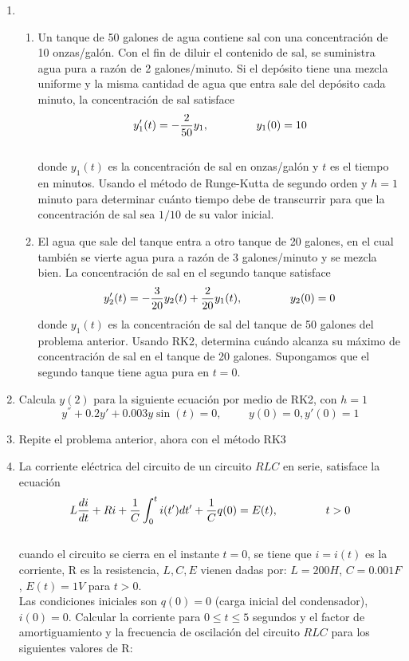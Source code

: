 \documentclass[12pt]{article}
\begin{document}
\begin{enumerate}
\item \begin{enumerate}
\item Un tanque de 50 galones de agua contiene sal con una concentración de 10 onzas/galón. Con el fin de diluir el contenido de sal, se suministra agua pura a razón de 2 galones/minuto. Si el depósito tiene una mezcla uniforme y la misma cantidad de agua que entra sale del depósito cada minuto, la concentración de sal satisface\\
\[ y'_{1}(t)= -\frac{2}{50}y_{1}, \hspace{1.5cm} y_{1}(0)=10 \]\\
donde $y_{1}(t)$ es la concentración de sal en onzas/galón y $t$ es el tiempo en minutos. Usando el método de Runge-Kutta de segundo orden y $h=1$ minuto para determinar cuánto tiempo debe de transcurrir para que la concentración de sal sea $1/10$ de su valor inicial.
\item El agua que sale del tanque entra a otro tanque de 20 galones, en el cual también se vierte agua pura a razón de 3 galones/minuto y se mezcla bien. La concentración de sal en el segundo tanque satisface
\[ y'_{2}(t)= -\frac{3}{20}y_{2}(t)+\dfrac{2}{20}y_{1}(t), \hspace{1.5cm} y_{2}(0)=0 \]
donde $y_{1}(t)$ es la concentración de sal del tanque de 50 galones del problema anterior. Usando RK2, determina cuándo alcanza su máximo de concentración de sal en el tanque de 20 galones. Supongamos que el segundo tanque tiene agua pura en $t=0$.
\end{enumerate}
\item Calcula $y(2)$ para la siguiente ecuación por medio de RK2, con $h=1$
\[ y^{''} +0.2 y{'} + 0.003 y \sin(t) = 0, \hspace{1cm} y(0)=0, y{'}(0)=1 \]
\item Repite el problema anterior, ahora con el método RK3
\item La corriente eléctrica del circuito de un circuito $RLC$ en serie, satisface la ecuación\\
\[ L \frac{di}{dt}+ Ri+ \frac{1}{C} \int_{0}^{t} i(t') dt' +\frac{1}{C}q(0)= E(t), \hspace{1.5cm} t>0 \]\\
cuando el circuito se cierra en el instante $t=0$, se tiene que $i=i(t)$ es la corriente, R es la resistencia, $L,C,E$ vienen dadas por: $L=200H$, $C=0.001F$, $E(t)=1V$ para $t>0$.\\
Las condiciones iniciales son $q(0)=0$ (carga inicial del condensador), $i(0)=0$. Calcular la corriente para $0 \leq t \leq 5$ segundos y el factor de amortiguamiento y la frecuencia de oscilación del circuito $RLC$ para los siguientes valores de R:\\

\end{enumerate}
\end{document}
